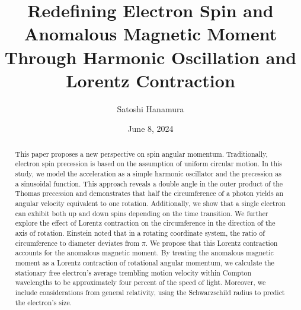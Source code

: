 \documentclass[%
 reprint,
 amsmath,amssymb,
 aps,
]{revtex4-1}
\numberwithin{equation}{section}%
\begin{document}

    \title{Redefining Electron Spin and Anomalous Magnetic Moment \\ Through Harmonic Oscillation and Lorentz Contraction}

    
    \author{Satoshi Hanamura}
    \date{June 8, 2024}
    
    \begin{abstract}


    This paper proposes a new perspective on spin angular momentum. Traditionally, electron spin precession is based on the assumption of uniform circular motion. In this study, we model the acceleration as a simple harmonic oscillator and the precession as a sinusoidal function. This approach reveals a double angle in the outer product of the Thomas precession and demonstrates that half the circumference of a photon yields an angular velocity equivalent to one rotation. Additionally, we show that a single electron can exhibit both up and down spins depending on the time transition. We further explore the effect of Lorentz contraction on the circumference in the direction of the axis of rotation. Einstein noted that in a rotating coordinate system, the ratio of circumference to diameter deviates from $\pi$. We propose that this Lorentz contraction accounts for the anomalous magnetic moment. By treating the anomalous magnetic moment as a Lorentz contraction of rotational angular momentum, we calculate the stationary free electron's average trembling motion velocity within Compton wavelengths to be approximately four percent of the speed of light. Moreover, we include considerations from general relativity, using the Schwarzschild radius to predict the electron's size.


\end{abstract}
\end{document}
